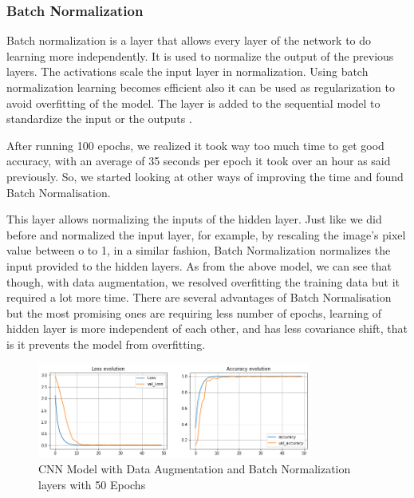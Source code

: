 \documentclass[conference]{IEEEtran}
\begin{document}
\subsubsection{Batch Normalization}

Batch normalization is a layer that allows every layer of the network to do learning more independently. It is used to normalize the output of the previous layers. The activations scale the input layer in normalization. Using batch normalization learning becomes efficient also it can be used as regularization to avoid overfitting of the model. The layer is added to the sequential model to standardize the input or the outputs \cite{towardsdatascience_jachak}. 

After running 100 epochs, we realized it took way too much time to get good accuracy, with an average of 35 seconds per epoch it took over an hour as said previously. So, we started looking at other ways of improving the time and found Batch Normalisation.

This layer allows normalizing the inputs of the hidden layer. Just like we did before and normalized the input layer, for example, by rescaling the image’s pixel value between o to 1, in a similar fashion, Batch Normalization normalizes the input provided to the hidden layers. As from the above model, we can see that though, with data augmentation, we resolved overfitting the training data but it required a lot more time. There are several advantages of Batch Normalisation but the most promising ones are requiring less number of epochs, learning of hidden layer is more independent of each other, and has less covariance shift, that is it prevents the model from overfitting.

\begin{figure}[htbp]
    \centerline{\includegraphics[width=9cm]{img/final_model_batch_50ep.png}}
    \caption{CNN Model with Data Augmentation and Batch Normalization layers with 50 Epochs}
    \label{fig:hist_train_classes}
\end{figure}
\end{document}
